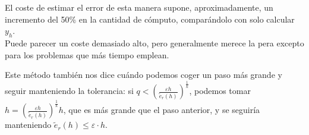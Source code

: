 \begin{remark}
El coste de estimar el error de esta manera supone, aproximadamente, un incremento del 50\% en la cantidad de cómputo, comparándolo con solo calcular $y_h$.\\
Puede parecer un coste demasiado alto, pero generalmente merece la pera excepto para los problemas que más tiempo emplean. 
\end{remark}  
\begin{remark}
Este método también nos dice cuándo podemos coger un paso más grande y seguir manteniendo la tolerancia: si $q < \left(\frac{\varepsilon h}{\tilde{e}_r(h)}\right)^{\frac{1}{k}}$, podemos tomar $h=\left(\frac{\varepsilon h}{\tilde{e}_r(h)}\right)^{\frac{1}{k}}h$, que es más grande que el paso anterior, y se seguiría manteniendo $\tilde{e}_r(h)\leq \varepsilon\cdot h$.
\end{remark}

